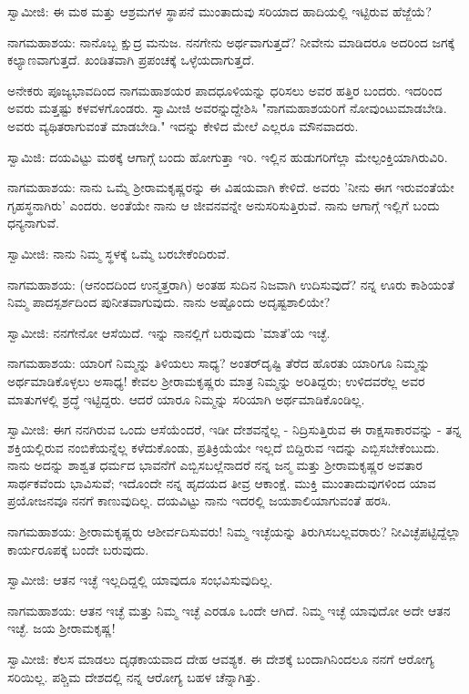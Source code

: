ಸ್ವಾಮೀಜಿ: ಈ ಮಠ ಮತ್ತು ಆಶ್ರಮಗಳ ಸ್ಥಾಪನೆ ಮುಂತಾದುವು ಸರಿಯಾದ ಹಾದಿಯಲ್ಲಿ ಇಟ್ಟಿರುವ ಹೆಜ್ಜೆಯೆ?

ನಾಗಮಹಾಶಯ: ನಾನೊಬ್ಬ ಕ್ಷುದ್ರ ಮನುಜ. ನನಗೇನು ಅರ್ಥವಾಗುತ್ತದೆ? ನೀವೇನು ಮಾಡಿದರೂ ಅದರಿಂದ ಜಗಕ್ಕೆ ಕಲ್ಯಾಣವಾಗುತ್ತದೆ. ಖಂಡಿತವಾಗಿ ಪ್ರಪಂಚಕ್ಕೆ ಒಳ್ಳೆಯದಾಗುತ್ತದೆ.

ಅನೇಕರು ಪೂಜ್ಯಭಾವದಿಂದ ನಾಗಮಹಾಶಯರ ಪಾದಧೂಳಿಯನ್ನು ಧರಿಸಲು ಅವರ ಹತ್ತಿರ ಬಂದರು. ಇದರಿಂದ ಅವರು ಮತ್ತಷ್ಟು ಕಳವಳಗೊಂಡರು. ಸ್ವಾಮೀಜಿ ಅವರನ್ನುದ್ದೇಶಿಸಿ "ನಾಗಮಹಾಶಯರಿಗೆ ನೋವುಂಟುಮಾಡಬೇಡಿ. ಅವರು ವ್ಯಥಿತರಾಗುವಂತೆ ಮಾಡಬೇಡಿ." ಇದನ್ನು ಕೇಳಿದ ಮೇಲೆ ಎಲ್ಲರೂ ಮೌನವಾದರು.

ಸ್ವಾಮಿಜಿ: ದಯವಿಟ್ಟು ಮಠಕ್ಕೆ ಆಗಾಗ್ಗೆ ಬಂದು ಹೋಗುತ್ತಾ ಇರಿ. ಇಲ್ಲಿನ ಹುಡುಗರಿಗೆಲ್ಲಾ ಮೇಲ್ಪಂಕ್ತಿಯಾಗಿರುವಿರಿ.

ನಾಗಮಹಾಶಯ: ನಾನು ಒಮ್ಮೆ ಶ‍್ರೀರಾಮಕೃಷ್ಣರನ್ನು ಈ ವಿಷಯವಾಗಿ ಕೇಳಿದೆ. ಅವರು 'ನೀನು ಈಗ ಇರುವಂತೆಯೇ ಗೃಹಸ್ಥನಾಗಿರು' ಎಂದರು. ಅಂತೆಯೇ ನಾನು ಆ ಜೀವನವನ್ನೇ ಅನುಸರಿಸುತ್ತಿರುವೆ. ನಾನು ಆಗಾಗ್ಗೆ ಇಲ್ಲಿಗೆ ಬಂದು ಧನ್ಯನಾಗುವೆ.

ಸ್ವಾಮೀಜಿ: ನಾನು ನಿಮ್ಮ ಸ್ಥಳಕ್ಕೆ ಒಮ್ಮೆ ಬರಬೇಕೆಂದಿರುವೆ.

ನಾಗಮಹಾಶಯ: (ಆನಂದದಿಂದ ಉನ್ಮತ್ತರಾಗಿ) ಅಂತಹ ಸುದಿನ ನಿಜವಾಗಿ ಉದಿಸುವುದೆ? ನನ್ನ ಊರು ಕಾಶಿಯಂತೆ ನಿಮ್ಮ ಪಾದಸ್ಪರ್ಶದಿಂದ ಪುನೀತವಾಗುವುದು. ನಾನು ಅಷ್ಟೊಂದು ಅದೃಷ್ಟಶಾಲಿಯೇ?

ಸ್ವಾಮೀಜಿ: ನನಗೇನೋ ಆಸೆಯಿದೆ. ಇನ್ನು ನಾನಲ್ಲಿಗೆ ಬರುವುದು 'ಮಾತೆ'ಯ ಇಚ್ಛೆ.

ನಾಗಮಹಾಶಯ: ಯಾರಿಗೆ ನಿಮ್ಮನ್ನು ತಿಳಿಯಲು ಸಾಧ್ಯ? ಅಂತರ್‌ದೃಷ್ಟಿ ತೆರೆದ ಹೊರತು ಯಾರಿಗೂ ನಿಮ್ಮನ್ನು ಅರ್ಥಮಾಡಿಕೊಳ್ಳಲು ಅಸಾಧ್ಯ! ಕೇವಲ ಶ‍್ರೀರಾಮಕೃಷ್ಣರು ಮಾತ್ರ ನಿಮ್ಮನ್ನು ಅರಿತಿದ್ದರು; ಉಳಿದವರೆಲ್ಲ ಅವರ ಮಾತುಗಳಲ್ಲಿ ಶ್ರದ್ಧೆ ಇಟ್ಟಿದ್ದರು. ಆದರೆ ಯಾರೂ ನಿಮ್ಮನ್ನು ಸರಿಯಾಗಿ ಅರ್ಥಮಾಡಿಕೊಂಡಿಲ್ಲ.

ಸ್ವಾಮೀಜಿ: ಈಗ ನನಗಿರುವ ಒಂದು ಆಸೆಯೆಂದರೆ, ಇಡೀ ದೇಶವನ್ನೆಲ್ಲ - ನಿದ್ರಿಸುತ್ತಿರುವ ಈ ರಾಕ್ಷಸಾಕಾರವನ್ನು - ತನ್ನ ಶಕ್ತಿಯಲ್ಲಿರುವ ನಂಬಿಕೆಯನ್ನೆಲ್ಲ ಕಳೆದುಕೊಂಡು, ಪ್ರತಿಕ್ರಿಯೆಯೇ ಇಲ್ಲದೆ ಬಿದ್ದಿರುವ ಇದನ್ನು ಎಬ್ಬಿಸಬೇಕೆಂಬುದು. ನಾನು ಅದನ್ನು ಶಾಶ್ವತ ಧರ್ಮದ ಭಾವನೆಗೆ ಎಬ್ಬಿಸಬಲ್ಲೆನಾದರೆ ನನ್ನ ಜನ್ಮ ಮತ್ತು ಶ‍್ರೀರಾಮಕೃಷ್ಣರ ಅವತಾರ ಸಾರ್ಥಕವೆಂದು ಭಾವಿಸುವೆ; ಇದೊಂದೇ ನನ್ನ ಹೃದಯದ ತೀವ್ರ ಆಕಾಂಕ್ಷೆ. ಮುಕ್ತಿ ಮುಂತಾದುವುಗಳಿಂದ ಯಾವ ಪ್ರಯೋಜನವೂ ನನಗೆ ಕಾಣುವುದಿಲ್ಲ. ದಯವಿಟ್ಟು ನಾನು ಇದರಲ್ಲಿ ಜಯಶಾಲಿಯಾಗುವಂತೆ ಹರಸಿ.

ನಾಗಮಹಾಶಯ: ಶ‍್ರೀರಾಮಕೃಷ್ಣರು ಆಶೀರ್ವದಿಸುವರು! ನಿಮ್ಮ ಇಚ್ಛೆಯನ್ನು ತಿರುಗಿಸಬಲ್ಲವರಾರು? ನೀವಿಚ್ಛೆಪಟ್ಟಿದ್ದೆಲ್ಲಾ ಕಾರ್ಯರೂಪಕ್ಕೆ ಬಂದೇ ಬರುವುದು.

ಸ್ವಾಮೀಜಿ: ಆತನ ಇಚ್ಛೆ ಇಲ್ಲದಿದ್ದಲ್ಲಿ ಯಾವುದೂ ಸಂಭವಿಸುವುದಿಲ್ಲ.

ನಾಗಮಹಾಶಯ: ಆತನ ಇಚ್ಛೆ ಮತ್ತು ನಿಮ್ಮ ಇಚ್ಛೆ ಎರಡೂ ಒಂದೇ ಆಗಿದೆ. ನಿಮ್ಮ ಇಚ್ಛೆ ಯಾವುದೋ ಅದೇ ಆತನ ಇಚ್ಛೆ. ಜಯ ಶ‍್ರೀರಾಮಕೃಷ್ಣ!

ಸ್ವಾಮೀಜಿ: ಕೆಲಸ ಮಾಡಲು ದೃಢಕಾಯವಾದ ದೇಹ ಆವಶ್ಯಕ. ಈ ದೇಶಕ್ಕೆ ಬಂದಾಗಿನಿಂದಲೂ ನನಗೆ ಆರೋಗ್ಯ ಸರಿಯಿಲ್ಲ. ಪಶ್ಚಿಮ ದೇಶದಲ್ಲಿ ನನ್ನ ಆರೋಗ್ಯ ಬಹಳ ಚೆನ್ನಾಗಿತ್ತು.


